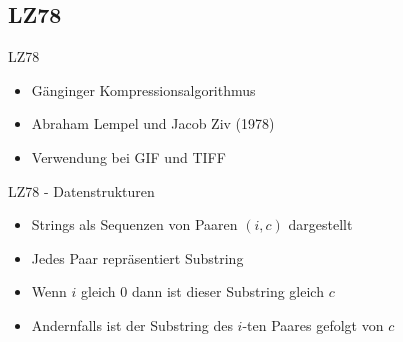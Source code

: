 \subsection{LZ78}

\begin{frame}{\FrameName}
	\begin{block}{LZ78}
		\begin{itemize}[<+->]
			\item Gänginger Kompressionsalgorithmus
			\item Abraham Lempel und Jacob Ziv (1978)
			\item Verwendung bei GIF und TIFF 
		\end{itemize}
	\end{block}
	\end{frame}

\begin{frame}{\FrameName}
\begin{block}{LZ78 - Datenstrukturen}
	\begin{itemize}[<+->]
		\item Strings als Sequenzen von Paaren $(i,c)$ dargestellt \linebreak {}
		\item Jedes Paar repräsentiert Substring
		\item Wenn $i$ gleich $0$ dann ist dieser Substring gleich $c$
		\item Andernfalls ist der Substring des $i$-ten Paares gefolgt von $c$
	\end{itemize}
\end{block}
\end{frame}


